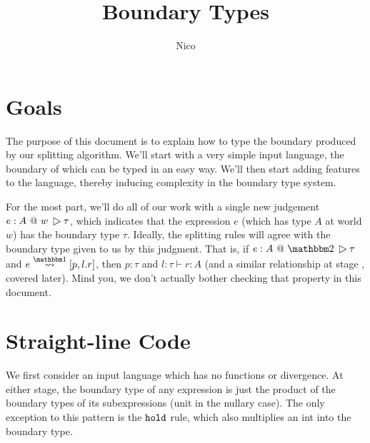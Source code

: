\documentclass[]{article}
\title{Boundary Types}
\author{Nico}
\newcommand {\next}{asdlfkj}
\begin{document}
\maketitle

\newcommand {\ibksym} {\rotatebox[origin=c]{270}{$\therefore$}}
\newcommand {\btsym} {\rotatebox[origin=c]{270}{$\triangle$}}
\newcommand {\ktype} {\rm Type}
\newcommand {\ibk} [2] {{#1}~\ibksym~{#2}}
\newcommand {\btj} [4] {{#1}:{#2}~@~{#3}~\btsym~{#4}}
\newcommand {\btyo} [4] [\Gamma] {{#1}\vdash \btj{#2}{#3}\bbone{#4}}
\newcommand {\btyt} [4] [\Gamma] {{#1}\vdash \btj{#2}{#3}\bbtwo{#4}}
\newcommand {\btyw} [4] [\Gamma] {{#1}\vdash \btj{#2}{#3}w{#4}}
\newcommand {\btysub} [2] [] {\bty{e_{#1}:{#2}}{\tau_{#1}}{\sigma_{#1}}}

\section{Goals}

The purpose of this document is to explain how to type the boundary produced by our splitting algorithm.
We'll start with a very simple input language, the boundary of which can be typed in an easy way.
We'll then start adding features to the language, thereby inducing complexity in the boundary type system.

For the most part, we'll do all of our work with a single new judgement $\btj e A w \tau$, 
which indicates that the expression $e$ (which has type $A$ at world $w$) has the boundary type $\tau$.
Ideally, the splitting rules will agree with the boundary type given to us by this judgment.
That is, if $\btj e A \bbtwo \tau$ and $\splitone{e}{A}{p,l.r}$, 
then $p:\tau$ and $l:\tau \vdash r:A$ (and a similar relationship at stage \bbone, covered later).
Mind you, we don't actually bother checking that property in this document.

\section{Straight-line Code}

We first consider an input language which has no functions or divergence.
At either stage, the boundary type of any expression is 
just the product of the boundary types of its subexpressions
(unit in the nullary case).
The only exception to this pattern is the ${\tt hold}$ rule,
which also multiplies an int into the boundary type.

\end{document}
